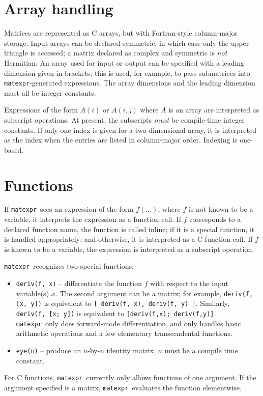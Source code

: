 \documentclass[12pt]{article}
\newcommand{\matexpr}{\texttt{matexpr}}
\begin{document}
\section{Array handling}

Matrices are represented as C arrays, but with Fortran-style
column-major storage.  Input arrays can be declared symmetric, in
which case only the upper triangle is accessed; a matrix declared as
complex and symmetric is {\em not} Hermitian.  An array used for input
or output can be specified with a leading dimension given in brackets;
this is used, for example, to pass submatrices into \matexpr-generated
expressions.  The array dimensions and the leading dimension must all
be integer constants.

Expressions of the form $A(i)$ or $A(i,j)$ where $A$ is an array are
interpreted as subscript operations.  At present, the subscripts
\emph{must} be compile-time integer constants.  If only one index is given
for a two-dimensional array, it is interpreted as the index when the
entries are listed in column-major order.  Indexing is one-based.


\section{Functions}

If \matexpr\ sees an expression of the form $f(...)$, where $f$ is not
known to be a variable, it interprets the expression as a function
call.  If $f$ corresponds to a declared function name, the function is
called inline; if it is a special function, it is handled
appropriately; and otherwise, it is interpreted as a C function call.
If $f$ is known to be a variable, the expression is interpreted as a
subscript operation.

\matexpr\ recognizes two special functions:
\begin{itemize}
\item 
  {\tt deriv(f, x)} -- differentiate the function $f$ with respect
  to the input variable(s) $x$.  The second argument can be a
  matrix; for example, {\tt deriv(f, [x, y])} is equivalent to
  {\tt [ deriv(f, x), deriv(f, y) ]}.  Similarly,
  {\tt deriv(f, [x; y])} is equivalent to {\tt [deriv(f,x); deriv(f,y)]}.
  \matexpr\ only does forward-mode differentiation, and only handles
  basic arithmetic operations and a few elementary transcendental functions.
\item
  {\tt eye(n)} -- produce an $n$-by-$n$ identity matrix.  $n$ must be a
  compile time constant.
\end{itemize}

For C functions, \matexpr\ currently only allows functions of one
argument.  If the argument specified is a matrix, \matexpr\ evaluates
the function elementwise.
\end{document}

